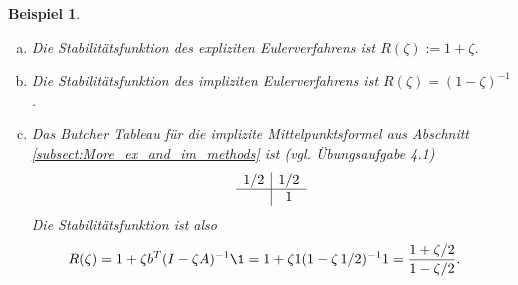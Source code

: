 \documentclass[
]{mycourse}
\theoremstyle{mythm}
\newtheorem{beispiel}[theorem]{Beispiel}
\theoremstyle{break}
\begin{document}
\begin{beispiel}
\begin{enumerate}[(a)]
\item Die Stabilitätsfunktion des expliziten Eulerverfahrens ist
$R(\zeta):=1+\zeta$.
\item Die Stabilitätsfunktion des impliziten Eulerverfahrens ist $R(\zeta)=(1-\zeta )^{-1}$.
\item Das Butcher Tableau für die implizite Mittelpunktsformel aus Abschnitt \ref{subsect:More_ex_and_im_methods} 
ist (vgl. Übungsaufgabe 4.1)
\[
\begin{array}{c | c}
1/2 & 1/2\\ \hline
 & 1
\end{array}
\]
Die Stabilitätsfunktion ist also
\begin{align*}
R(\zeta) &= 1+\zeta b^T (I-\zeta A)^{-1} \1= 1+\zeta 1 (1-\zeta\, 1/2)^{-1} 1
= \frac{1+\zeta/2}{1-\zeta/2}.
\end{align*}

\end{enumerate}
\end{beispiel}
\end{document}

